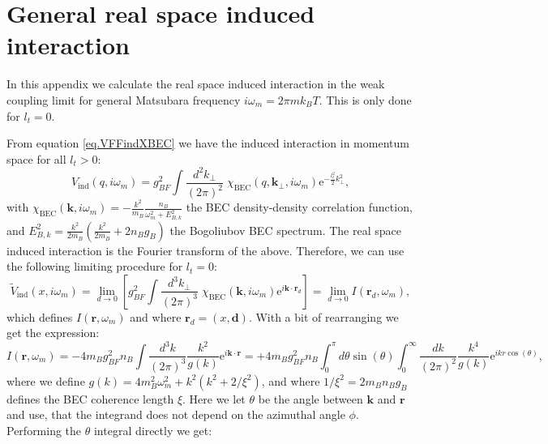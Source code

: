 
\chapter{General real space induced interaction} %

\label{AppendixD} %
\chead{}
In this appendix we calculate the real space induced interaction in the weak coupling limit for general Matsubara frequency $i\omega_m = 2\pi m k_B T$. This is only done for $l_t = 0$. 

From equation \eqref{eq.VFFindXBEC} we have the induced interaction in momentum space for all $l_t > 0$:
\begin{equation}
V_{\text{ind}}(q, i\omega_m) = g_{BF}^2\int\frac{d^2k_\perp}{(2\pi)^2}\; \chi_\text{BEC}(q, \mathbf{k}_\perp, i\omega_m)\text{e}^{-\frac{l_t^2}{2}k_\perp^2},\nonumber
\end{equation}
with $\chi_\text{BEC}(\mathbf{k}, i\omega_m) = -\frac{k^2}{m_B}\frac{n_B}{\omega^2_m + E_{B,k}^2}$ the BEC density-density correlation function, and $E^2_{B,k} = \frac{k^2}{2m_B}\left(\frac{k^2}{2m_B} + 2n_Bg_B\right)$ the Bogoliubov BEC spectrum. The real space induced interaction is the Fourier transform of the above. Therefore, we can use the following limiting procedure for $l_t = 0$:
\begin{equation}
\tilde{V}_{\text{ind}}(x, i\omega_m) = \lim_{d \to 0}\left[g_{BF}^2\int\frac{d^3k_\perp}{(2\pi)^3}\; \chi_\text{BEC}(\mathbf{k}, i\omega_m)\text{e}^{i\mathbf{k}\cdot \mathbf{r}_d}\right] = \lim_{d \to 0} I(\mathbf{r}_d, \omega_m), 
\label{eq.limitVindxomegam}
\end{equation}
which defines $I(\mathbf{r}, \omega_m)$ and where $\mathbf{r}_d = (x, \mathbf{d})$. With a bit of rearranging we get the expression:
\begin{equation}
I(\mathbf{r}, \omega_m) = -4m_Bg^2_{BF}n_B\int \frac{d^3k}{(2\pi)^3} \frac{k^2}{g(k)}\text{e}^{i\mathbf{k}\cdot\mathbf{r}} = +4m_Bg^2_{BF}n_B\int_0^\pi d\theta \sin(\theta)\int_0^{\infty} \frac{dk}{(2\pi)^2} \frac{k^4}{g(k)}\text{e}^{ikr\cos(\theta)}, \nonumber
\end{equation}
where we define $g(k) = 4m_B^2\omega^2_m + k^2(k^2 + 2/\xi^2)$, and where $1/\xi^2 = 2m_Bn_Bg_B$ defines the BEC coherence length $\xi$. Here we let $\theta$ be the angle between $\mathbf{k}$ and $\mathbf{r}$ and use, that the integrand does not depend on the azimuthal angle $\phi$. Performing the $\theta$ integral directly we get:

